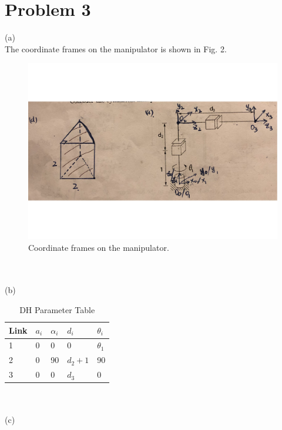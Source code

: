 \documentclass[twoside,11pt]{homework}
\begin{document}
\section*{Problem 3}
(a)\\
The coordinate frames on the manipulator is shown in Fig. 2.
%
\begin{figure}[h!]
\centering
\includegraphics[scale=0.55]{p3}
\caption{Coordinate frames on the manipulator.}
\label{F2}
\end{figure}
%
\\\\
(b)\\
%
\begin{table}[h!] \centering
\caption{DH Parameter Table}
\begin{tabular}{|l|l|l|l|l|}
\hline
Link & $a_i$ & \textbf{$\alpha_i$} & $d_i$   & $\theta_i$ \\ \hline
1             & 0             & 0                 & 0      & $\theta_1$ \\ \hline
2             & 0             & 90                & $d_2+1$ & 90       \\ \hline
3             & 0             & 0                 & $d_3$   & 0        \\ \hline
\end{tabular}
\end{table}
%
\\\\
(c)
\end{document}
